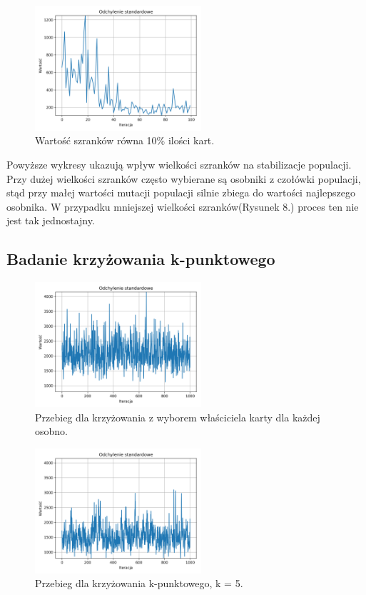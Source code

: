 \documentclass[12pt]{article}
\begin{document}
\begin{figure}[h]
	\centering					\includegraphics[width=0.55\textwidth]{tournament_2.png}
	\caption{Wartość szranków równa 10\% ilości kart.}
	\label{fig1}
\end{figure}

Powyższe wykresy ukazują wpływ wielkości szranków na stabilizacje populacji. Przy dużej wielkości szranków często wybierane są osobniki z czołówki populacji, stąd przy małej wartości mutacji populacji silnie zbiega do wartości najlepszego osobnika. W przypadku mniejszej wielkości szranków(Rysunek 8.) proces ten nie jest tak jednostajny. 

\newpage
\subsection{Badanie krzyżowania k-punktowego}
\begin{figure}[h]
	\centering					\includegraphics[width=0.55\textwidth]{k_1.png}
	\caption{Przebieg dla krzyżowania z wyborem właściciela karty dla każdej osobno.}
	\label{fig1}
\end{figure}


\begin{figure}[h]
	\centering					\includegraphics[width=0.55\textwidth]{k_2.png}
	\caption{Przebieg dla krzyżowania k-punktowego, k = 5.}
	\label{fig1}
\end{figure}
\end{document}
